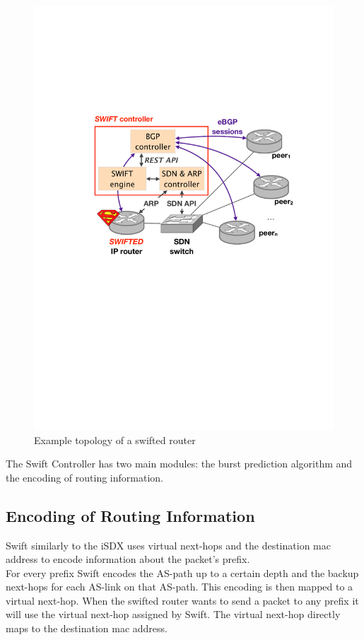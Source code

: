 \begin{figure}[h]
\center
\includegraphics[scale = 0.5]{Figures/bckgrnd_swift_architecture.pdf}
\caption{Example topology of a swifted router}
\end{figure}

The Swift Controller has two main modules: the burst prediction algorithm and the encoding of routing information. 

\subsection{\label{chapter2:Swift:encoding of routing information}Encoding of Routing Information}
Swift similarly to the iSDX uses virtual next-hops and the destination mac address to encode information about the packet's prefix.\\
For every prefix Swift encodes the AS-path up to a certain depth and the backup next-hops for each AS-link on that AS-path. This encoding is then mapped to a virtual next-hop. When the swifted router wants to send a packet to any prefix it will use the virtual next-hop assigned by Swift. The virtual next-hop directly maps to the destination mac address. 

